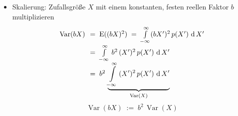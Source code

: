 \begin{itemize}
\item Skalierung:
Zufallsgröße $X$ mit einem konstanten, festen reellen Faktor $b$ multiplizieren
\begin{equation}
\arraycolsep=3.5pt\def\arraystretch{1.8}
\begin{array}{ll}
\operatorname {Var}(b X) & = \; \operatorname{E}((b X)^2) \; = \; 
 \int\limits_{-\infty}^{\infty}
 (b X^\prime)^2 \, p(X^\prime) \, \operatorname{d} X^\prime\\
 & =\;  \int\limits_{-\infty}^{\infty} \, b^2 \,
 (X^\prime)^2 \, p(X^\prime) \, \operatorname{d} X^\prime\\
 & =\;  b^2 \, \underbrace{\int\limits_{-\infty}^{\infty} \, 
 (X^\prime)^2 \, p(X^\prime) \, \operatorname{d} X^\prime}_{\operatorname {Var}(X)}
\end{array}
\end{equation}
\begin{equation}
\operatorname {Var}(b X) \; := \; b^2 \, \operatorname {Var}(X)
\end{equation}
\end{itemize}


